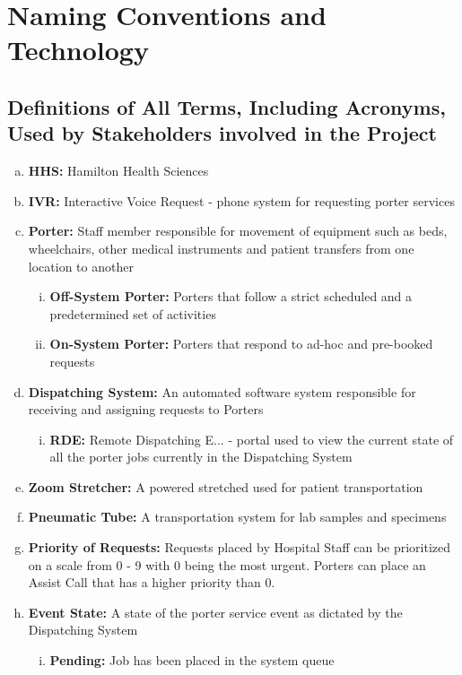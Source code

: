 \documentclass[paper=letter, fontsize=10pt]{scrartcl}
\numberwithin{equation}{section}		%
\numberwithin{figure}{section}			%
\numberwithin{table}{section}				%
\begin{document}
\section{Naming Conventions and Technology}
\subsection{Definitions of All Terms, Including Acronyms, Used by Stakeholders involved in the Project}
\begin{enumerate}[(a)]
	\item \textbf{HHS:} Hamilton Health Sciences
	\item \textbf{IVR:} Interactive Voice Request - phone system for requesting porter services
	\item \textbf{Porter:} Staff member responsible for movement of equipment such as beds, wheelchairs, other medical instruments and patient transfers from one location to another
	\begin{enumerate}[(i)]
		\item \textbf{Off-System Porter:} Porters that follow a strict scheduled and a predetermined set of activities
		\item \textbf{On-System Porter:} Porters that respond to ad-hoc and pre-booked requests	
	\end{enumerate}
	\item \textbf{Dispatching System:} An automated software system responsible for receiving and assigning requests to Porters
	\begin{enumerate}[(i)]
		\item \textbf{RDE:} Remote Dispatching E... - portal used to view the current state of all the porter jobs currently in the Dispatching System
	\end{enumerate}
	\item \textbf{Zoom Stretcher:} A powered stretched used for patient transportation
	\item \textbf{Pneumatic Tube:} A transportation system for lab samples and specimens
	\item \textbf{Priority of Requests:} Requests placed by Hospital Staff can be prioritized on a scale from 0 - 9 with 0 being the most urgent. Porters can place an Assist Call that has a higher priority than 0.
	\item \textbf{Event State:} A state of the porter service event as dictated by the Dispatching System
	\begin{enumerate}[(i)]
		\item \textbf{Pending:} Job has been placed in the system queue

\end{enumerate}
\end{enumerate}
\end{document}
